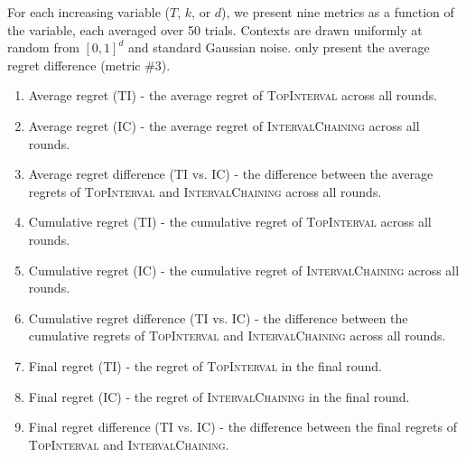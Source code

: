 \documentclass[11pt]{article}
\begin{document}
For each increasing variable ($T$, $k$, or $d$), we present nine metrics as a function of the variable, each averaged over 50 trials. Contexts are drawn uniformly at random from $[0,1]^d$ and standard Gaussian noise.  only present the average regret difference (metric \#3).
\begin{enumerate}
	\item Average regret (TI) - the average regret of \textsc{TopInterval} across all rounds.
	\item Average regret (IC) - the average regret of \textsc{IntervalChaining} across all rounds.
	\item Average regret difference (TI vs. IC) - the difference between the average regrets of \textsc{TopInterval} and \textsc{IntervalChaining} across all rounds.
	\item Cumulative regret (TI) - the cumulative regret of \textsc{TopInterval} across all rounds.
	\item Cumulative regret (IC) - the cumulative regret of \textsc{IntervalChaining} across all rounds.
	\item Cumulative regret difference (TI vs. IC) - the difference between the cumulative regrets of \textsc{TopInterval} and \textsc{IntervalChaining} across all rounds.
	\item Final regret (TI) - the regret of \textsc{TopInterval} in the final round.
	\item Final regret (IC) - the regret of \textsc{IntervalChaining} in the final round.
	\item Final regret difference (TI vs. IC) - the difference between the final regrets of \textsc{TopInterval} and \textsc{IntervalChaining}.
\end{enumerate}
\end{document}
